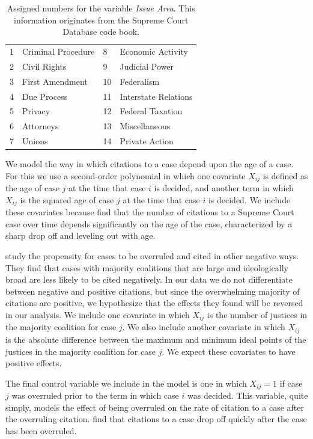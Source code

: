 \documentclass[headsepline=true, abstracton]{scrartcl}
\begin{document}
\begin{table}[bt]

	\label{issue_area_coding}
	\centering
	\begin{tabular}{llll}
		1 & Criminal Procedure & 8  & Economic Activity    \\
		2 & Civil Rights       & 9  & Judicial Power       \\
		3 & First Amendment    & 10 & Federalism           \\
		4 & Due Process        & 11 & Interstate Relations \\
		5 & Privacy            & 12 & Federal Taxation     \\
		6 & Attorneys          & 13 & Miscellaneous        \\
		7 & Unions             & 14 & Private Action      
	\end{tabular}
	\caption{Assigned numbers for the variable \textit{Issue Area}. This information originates from the Supreme Court Database code book.}
\end{table}

We model the way in which citations to a case depend upon the age of a case. For this we use a second-order polynomial in which one covariate $X_{ij}$ is defined as the age of case $j$ at the time that case $i$ is decided, and another term in which $X_{ij}$ is the squared age of case $j$ at the time that case $i$ is decided. We include these covariates because \citet{black2013citation} find that the number of citations to a Supreme Court case over time depends significantly on the age of the case, characterized by a sharp drop off and leveling out with age. 

\citet{benjamin2012standing} study the propensity for cases to be overruled and cited in other negative ways. They find that cases with majority coalitions that are large and ideologically broad are less likely to be cited negatively. In our data we do not differentiate between negative and positive citations, but since the overwhelming majority of citations are positive, we hypothesize that the effects they found will be reversed in our analysis. We include one covariate in which $X_{ij}$ is the number of justices in the majority coalition for case $j$. We also include another covariate in which $X_{ij}$ is the absolute difference between the maximum and minimum ideal points of the justices in the majority coalition for case $j$. We expect these covariates to have positive effects.

The final control variable we include in the model is one in which $X_{ij} = 1$ if case $j$ was overruled prior to the term in which case $i$ was decided. This variable, quite simply, models the effect of being overruled on the rate of citation to a case after the overruling citation. \citet{fowler2008authority} find that citations to a case drop off quickly after the case has been overruled.
\end{document}
